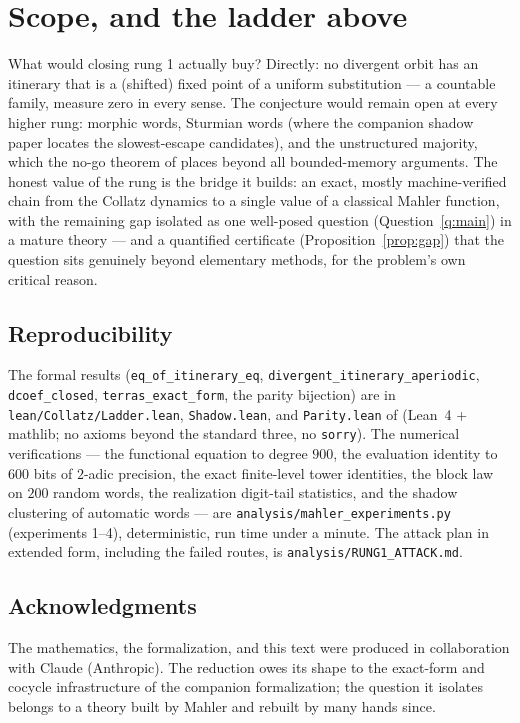 \documentclass[11pt]{article}
\theoremstyle{definition}
\newcommand{\code}[1]{\texttt{#1}}
\begin{document}
\section{Scope, and the ladder above}\label{sec:scope}

What would closing rung 1 actually buy? Directly: no divergent orbit
has an itinerary that is a (shifted) fixed point of a uniform
substitution --- a countable family, measure zero in every sense.
The conjecture would remain open at every higher rung: morphic words,
Sturmian words (where the companion shadow paper locates the
slowest-escape candidates), and the unstructured majority, which the
no-go theorem of \cite{companion} places beyond all bounded-memory
arguments. The honest value of the rung is the bridge it builds: an
exact, mostly machine-verified chain from the Collatz dynamics to a
single value of a classical Mahler function, with the remaining gap
isolated as one well-posed question (Question~\ref{q:main}) in a
mature theory --- and a quantified certificate
(Proposition~\ref{prop:gap}) that the question sits genuinely beyond
elementary methods, for the problem's own critical reason.

\subsection*{Reproducibility}\label{sec:repro}

The formal results (\code{eq\_of\_itinerary\_eq},
\code{divergent\_itinerary\_aperiodic}, \code{dcoef\_closed},
\code{terras\_exact\_form}, the parity bijection) are in
\code{lean/Collatz/Ladder.lean}, \code{Shadow.lean}, and
\code{Parity.lean} of \cite{companion} (Lean~4 + mathlib; no axioms
beyond the standard three, no \code{sorry}). The numerical
verifications --- the functional equation to degree $900$, the
evaluation identity to $600$ bits of $2$-adic precision, the exact
finite-level tower identities, the block law on $200$ random words,
the realization digit-tail statistics, and the shadow clustering of
automatic words --- are
\code{analysis/mahler\_experiments.py} (experiments 1--4),
deterministic, run time under a minute. The attack plan in extended
form, including the failed routes, is
\code{analysis/RUNG1\_ATTACK.md}.

\subsection*{Acknowledgments}

The mathematics, the formalization, and this text were produced in
collaboration with Claude (Anthropic). The reduction owes its shape
to the exact-form and cocycle infrastructure of the companion
formalization; the question it isolates belongs to a theory built by
Mahler and rebuilt by many hands since.
\end{document}
